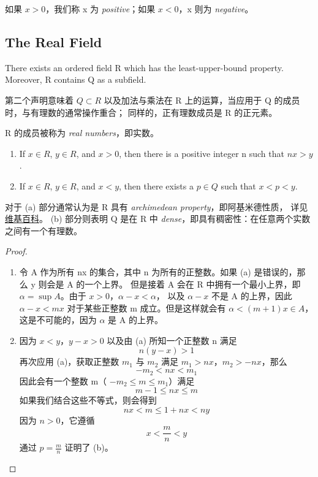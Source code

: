 \documentclass[../poma-note.tex]{subfiles}
\begin{document}
如果 $x>0$，我们称 x 为 \textit{positive}；如果 $x<0$，x 则为 \textit{negative}。

\subsection*{The Real Field}

\setcounter{poma}{18}
\begin{theorem}
	There exists an ordered field R which has the least-upper-bound property.
	Moreover, R contains Q as a subfield.
\end{theorem}

第二个声明意味着 $Q \subset R$ 以及加法与乘法在 R 上的运算，当应用于 Q 的成员时，与有理数的通常操作重合；
同样的，正有理数成员是 R 的正元素。

R 的成员被称为 \textit{real numbers}，即实数。


\begin{theorem}
	\leavevmode
	\begin{enumerate}[label=(\alph*)]
		\item If $x \in R$, $y \in R$, and $x>0$, then there is a positive integer n such that $nx>y$.
		\item If $x \in R$, $y \in R$, and $x<y$, then there exists a $p \in Q$ such that $x<p<y$.
	\end{enumerate}
\end{theorem}

对于 (a) 部分通常认为是 R 具有 \textit{archimedean property}，即阿基米德性质，
详见\href{https://en.wikipedia.org/wiki/Archimedean_property}{维基百科}。
(b) 部分则表明 Q 是在 R 中 \textit{dense}，即具有稠密性：在任意两个实数之间有一个有理数。

\begin{proof}
	\begin{enumerate}[label=(\alph*)]
		\item 令 A 作为所有 nx 的集合，其中 n 为所有的正整数。如果 (a) 是错误的，那么 y 则会是 A 的一个上界。
		      但是接着 A 会在 R 中拥有一个最小上界，即 $\alpha  = \sup A$。由于 $x>0$，$\alpha - x < \alpha$，
		      以及 $\alpha - x$ 不是 A 的上界，因此 $\alpha - x < mx$ 对于某些正整数 m 成立。但是这样就会有
		      $\alpha < (m+1)x \in A$，这是不可能的，因为 $\alpha$ 是 A 的上界。
		\item 因为 $x<y$，$y-x>0$ 以及由 (a) 所知一个正整数 n 满足
		      \[n(y-x)>1\]
		      再次应用 (a)，获取正整数 $m_1$ 与 $m_2$ 满足 $m_1 > nx$，$m_2 > -nx$，那么
		      \[-m_2 < nx < m_1\]
		      因此会有一个整数 m（ $-m_2 \le m \le m_1$）满足
		      \[m-1 \le nx \le m\]
		      如果我们结合这些不等式，则会得到
		      \[nx < m \le 1 + nx < ny\]
		      因为 $n>0$，它遵循
		      \[x < \frac{m}{n} < y\]
		      通过 $p=\frac{m}{n}$ 证明了 (b)。
	\end{enumerate}
\end{proof}
\end{document}
